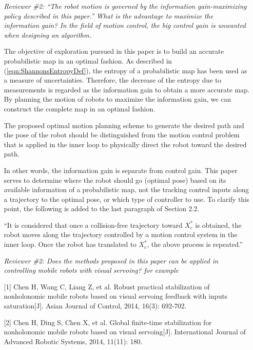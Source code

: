 \documentclass[11pt]{article}
\newcommand{\refeqn}[1]{(\ref{eqn:#1})}
\newenvironment{correction}{\begin{list}{}{\setlength{\leftmargin}{1cm}\setlength{\rightmargin}{1cm}}\vspace{\parsep}\item[]``}{''\end{list}}
\begin{document}
\begin{enumerate}\setlength{\itemsep}{2\parsep}

\item {\itshape Reviewer \#2: ``The robot motion is governed by the information gain-maximizing policy described in this paper.'' What is the advantage to maximize the information gain? In the field of motion control, the big control gain is unwanted when designing an algorithm.}


The objective of exploration pursued in this paper is to build an accurate probabilistic map in an optimal fashion. As described in \refeqn{ShannonsEntropyDef}, the entropy of a probabilistic map has been used as a measure of uncertainties. Therefore, the decrease of the entropy due to measurements is regarded as the information gain to obtain a more accurate map. By planning the motion of robots to maximize the information gain, we can construct the complete map in an optimal fashion. 

The proposed optimal motion planning scheme to generate the desired path and the pose of the robot should be distinguished from the motion control problem that is applied in the inner loop to physically direct the robot toward the desired path. 

In other words, the information gain is separate from control gain. This paper serves to determine where the robot should go (optimal pose) based on its available information of a probabilistic map, not the tracking control inputs along a trajectory to the optimal pose, or which type of controller to use. To clarify this point, the following is added to the last paragraph of Section 2.2.
\begin{correction}It is considered that once a collision-free trajectory toward $X_c^*$ is obtained, the robot moves along the trajectory controlled by a motion control system in the inner loop. Once the robot has translated to $X_c^*$, the above process is repeated.\end{correction}

\item {\itshape Reviewer \#2: Does the methods proposed in this paper can be applied in controlling mobile robots with visual servoing? for example

[1] Chen H, Wang C, Liang Z, et al. Robust practical stabilization of nonholonomic mobile robots based on visual servoing feedback with inputs saturation[J]. Asian Journal of Control, 2014, 16(3): 692-702.

[2] Chen H, Ding S, Chen X, et al. Global finite-time stabilization for nonholonomic mobile robots based on visual servoing[J]. International Journal of Advanced Robotic Systems, 2014, 11(11): 180.

}
\end{enumerate}
\end{document}

